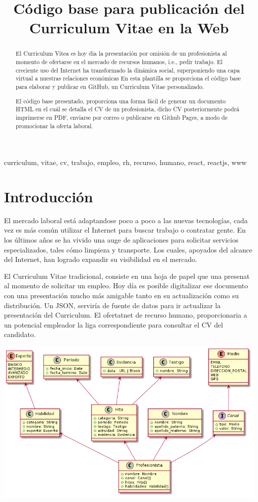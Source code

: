 \documentclass[conference]{IEEEtran}
\begin{document}
  \title{Código base para publicación del Curriculum Vitae en la Web}

  \author{
  }

  \maketitle

  \begin{abstract}
    El Curriculum Vitea es hoy dia la presentación por omisión de un profesionista al momento de ofertarse en el mercado de recursos humanos, i.e., pedir trabajo. El creciente uso del Internet ha transformado la dinámica social, superponiendo una capa virtual a nuestras relaciones económicas
    En esta plantilla se proporciona el código base para elaborar y publicar en GitHub, un Curriculum Vitae personalizado.

    El código base presentado, proporciona una forma fácil de generar un documento HTML en el cuál se detalla el CV de un profesionista, dicho CV posteriormente podrá imprimerse en PDF, enviarse por correo o publicarse en Github Pages, a modo de promocionar la oferta laboral.
  \end{abstract}

  \begin{IEEEkeywords}
    curriculum, vitae, cv, trabajo, empleo, rh, recurso, humano, react, reactjs, www
  \end{IEEEkeywords}

  \section{Introducción}
    El mercado laboral está adaptandose poco a poco a las nuevas tecnologías, cada vez es más común utilizar el Internet para buscar trabajo o contratar gente. En los últimos años se ha vivido una auge de aplicaciones para solicitar servicios especializados, tales cómo limpieza y transporte. Los cuales, apoyados del alcance del Internet, han logrado expandir su visibilidad en el mercado.

    El Curriculum Vitae tradicional, consiste en una hoja de papel que una presenat al momento de solicitar un empleo. Hoy día es posible digitalizar ese documento con una presentación mucho más amigable tanto en su actualización como su distribución. Un JSON, serviría de fuente de datos para ir actualizar la presentación del Curriculum. El ofertatnet de recurso humano, proporcionaria a un potencial empleador la liga correspondiente para consultar el CV del candidato.


    \includegraphics[width=\linewidth]{../arc/images/classes.png}
\end{document}
